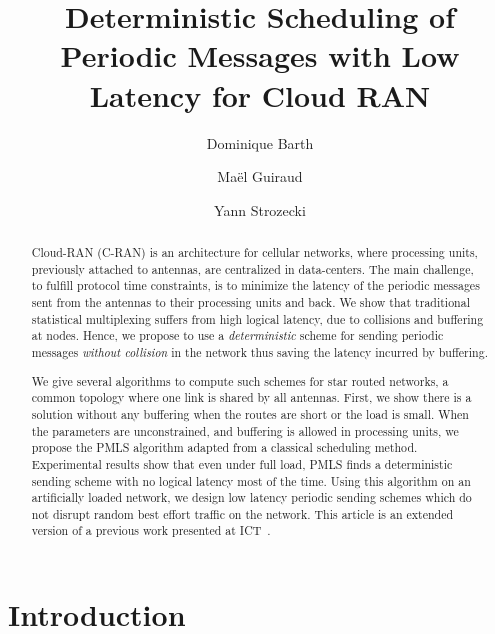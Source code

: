 \documentclass[a4paper,10pt]{article}
\title{Deterministic Scheduling of Periodic Messages with Low Latency for Cloud RAN}
\author[1]{Dominique Barth}
\author[1,2]{Ma\"el Guiraud}
\author[1]{Yann Strozecki}
\affil[1]{David Laboratory, UVSQ}
\affil[2]{Nokia Bell Labs France}
\begin{document}
\maketitle

\begin{abstract}
Cloud-RAN (C-RAN) is an architecture for cellular networks, where processing units, previously attached to antennas, are centralized in data-centers. The main challenge, to fulfill protocol time constraints, is to minimize the latency of the periodic messages sent from the antennas to their processing units and back. We show that traditional statistical multiplexing suffers from high logical latency, due to collisions and buffering at nodes. Hence, we propose to use a \emph{deterministic} scheme for sending periodic messages \emph{without collision} in the network thus saving the latency incurred by buffering.

We give several algorithms to compute such schemes for star routed networks, a common topology where one link is shared by all antennas. First, we show there is a solution without any buffering when the routes are short or the load is small. When the parameters are unconstrained, and buffering is allowed in processing units, we propose the PMLS algorithm adapted from a classical scheduling method. Experimental results show that even under full load,  PMLS finds a deterministic sending scheme with no logical latency most of the time. Using this algorithm on an artificially loaded network, we design low latency periodic sending schemes which do not disrupt random best effort traffic on the network. This article is an extended version of a previous work presented at ICT~\cite{Guir1806:Deterministic}.
\end{abstract}


\section{Introduction}
\end{document}
